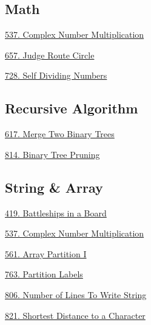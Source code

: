 \subsection*{Math}
\begin{flushleft}
    \hyperref[algo:537]{537. Complex Number Multiplication}

    \hyperref[algo:657]{657. Judge Route Circle}
    
    \hyperref[algo:728]{728. Self Dividing Numbers}
\end{flushleft}

\subsection*{Recursive Algorithm}
\begin{flushleft}
    \hyperref[algo:617]{617. Merge Two Binary Trees}

    \hyperref[algo:814]{814. Binary Tree Pruning}
\end{flushleft}

\subsection*{String \& Array}
\begin{flushleft}
    \hyperref[algo:419]{419. Battleships in a Board}

    \hyperref[algo:537]{537. Complex Number Multiplication}

    \hyperref[algo:561]{561. Array Partition I}
    
    \hyperref[algo:763]{763. Partition Labels}
    
    \hyperref[algo:806]{806. Number of Lines To Write String}
    
    \hyperref[algo:821]{821. Shortest Distance to a Character}
\end{flushleft}
